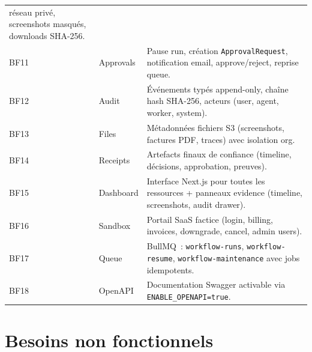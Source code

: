 \begin{longtable}{@{}p{1.2cm}p{2.2cm}p{10.2cm}@{}}
                      réseau privé, screenshots masqués, downloads SHA-256. \\
BF11 & Approvals    & Pause run, création \texttt{ApprovalRequest},
                      notification email, approve/reject, reprise queue. \\
\rowcolor{rowgray}
BF12 & Audit        & Événements typés append-only, chaîne hash SHA-256,
                      acteurs (user, agent, worker, system). \\
BF13 & Files        & Métadonnées fichiers S3 (screenshots, factures PDF,
                      traces) avec isolation org. \\
\rowcolor{rowgray}
BF14 & Receipts     & Artefacts finaux de confiance (timeline, décisions,
                      approbation, preuves). \\
BF15 & Dashboard    & Interface Next.js pour toutes les ressources +
                      panneaux evidence (timeline, screenshots, audit drawer). \\
\rowcolor{rowgray}
BF16 & Sandbox      & Portail SaaS factice (login, billing, invoices,
                      downgrade, cancel, admin users). \\
BF17 & Queue        & BullMQ~: \texttt{workflow-runs}, \texttt{workflow-resume},
                      \texttt{workflow-maintenance} avec jobs idempotents. \\
\rowcolor{rowgray}
BF18 & OpenAPI      & Documentation Swagger activable via
                      \texttt{ENABLE\_OPENAPI=true}. \\
\end{longtable}

\section{Besoins non fonctionnels}

